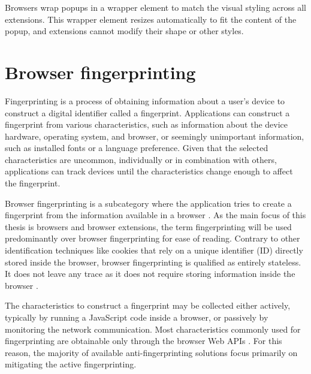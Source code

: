 Browsers wrap popups in a wrapper element to match the visual styling across all extensions. This wrapper element resizes automatically to fit the content of the popup, and extensions cannot modify their shape or other styles.




\chapter{Browser fingerprinting}
\label{Chapter:BrowserFingerprinting}

Fingerprinting is a process of obtaining information about a user's device to construct a digital identifier called a fingerprint. Applications can construct a fingerprint from various characteristics, such as information about the device hardware, operating system, and browser, or seemingly unimportant information, such as installed fonts or a language preference. Given that the selected characteristics are uncommon, individually or in combination with others, applications can track devices until the characteristics change enough to affect the fingerprint.

Browser fingerprinting is a subcategory where the application tries to create a fingerprint from the information available in a browser \cite{FingerprintingSurvey}.  As the main focus of this thesis is browsers and browser extensions, the term fingerprinting will be used predominantly over browser fingerprinting for ease of reading. Contrary to other identification techniques like cookies that rely on a unique identifier (ID) directly stored inside the browser, browser fingerprinting is qualified as entirely stateless. It does not leave any trace as it does not require storing information inside the browser \cite{FingerprintingSurvey}.

The characteristics to construct a fingerprint may be collected either actively, typically by running a JavaScript code inside a browser, or passively by monitoring the network communication. Most characteristics commonly used for fingerprinting are obtainable only through the browser Web APIs \cite{VondracekDP}. For this reason, the majority of available anti-fingerprinting solutions focus primarily on mitigating the active fingerprinting.

